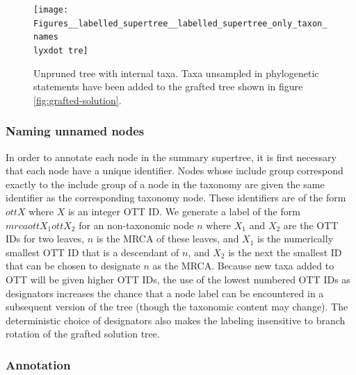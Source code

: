 \documentclass[fleqn,12pt,lineno,english]{wlpeerj}
\newcommand{\lyxdot}{.}
\begin{document}
\begin{figure}
\begin{centering}
\texttt{[image: Figures\_\_labelled\_supertree\_\_labelled\_supertree\_only\_taxon\_names\\lyxdot tre]}
\par\end{centering}
\caption{Unpruned tree with internal taxa. Taxa unsampled in phylogenetic
statements have been added to the grafted tree shown
in figure \ref{fig:grafted-solution}.}
\end{figure}


\subsubsection{Naming unnamed nodes}

In order to annotate each node in the summary supertree, it is first
necessary that each node have a unique identifier. Nodes whose include
group correspond exactly to the include group of a node in the taxonomy
are given the same identifier as the corresponding taxonomy node.
These identifiers are of the form $ottX$ where $X$ is an integer
OTT ID. We generate a label of the form $mrcaottX_{1}ottX_{2}$ for
an non-taxonomic node $n$ where $X_{1}$ and $X_{2}$ are the OTT
IDs for two leaves, $n$ is the MRCA of these leaves, and $X_{1}$
is the numerically smallest OTT ID that is a descendant of $n$, and
$X_{2}$ is the next the smallest ID that can be chosen to designate
$n$ as the MRCA. Because new taxa added to OTT will be given higher
OTT IDs, the use of the lowest numbered OTT IDs as designators increases
the chance that a node label can be encountered in a subsequent version
of the tree (though the taxonomic content may change). The deterministic
choice of designators also makes the labeling insensitive to branch
rotation of the grafted solution tree.

\subsubsection{Annotation}\label{sec:Annotation}
\end{document}

